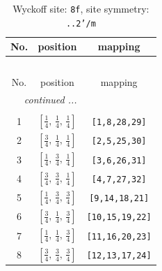 \documentclass[fleqn,8pt]{jsarticle}
\begin{document}
\begin{longtable}{ccc}
\caption{Wyckoff site: {\tt 8f}, site symmetry: {\tt ..2'/m}}
 \\
 \hline \hline
No. & position & mapping \\ \hline \endfirsthead

\multicolumn{2}{l}{\tablename\ \thetable{}} \\
 \hline \hline
No. & position & mapping \\ \hline \endhead

 \hline \hline
\multicolumn{2}{r}{\footnotesize\it continued ...} \\ \endfoot

 \hline \hline
\multicolumn{2}{r}{} \\ \endlastfoot

1 & $\left[ \frac{1}{4},\, \frac{1}{4},\, \frac{1}{4} \right]$ & {\tt [1,8,28,29]} \\ \hline
2 & $\left[ \frac{3}{4},\, \frac{1}{4},\, \frac{1}{4} \right]$ & {\tt [2,5,25,30]} \\ \hline
3 & $\left[ \frac{1}{4},\, \frac{3}{4},\, \frac{1}{4} \right]$ & {\tt [3,6,26,31]} \\ \hline
4 & $\left[ \frac{3}{4},\, \frac{3}{4},\, \frac{1}{4} \right]$ & {\tt [4,7,27,32]} \\ \hline
5 & $\left[ \frac{1}{4},\, \frac{3}{4},\, \frac{3}{4} \right]$ & {\tt [9,14,18,21]} \\ \hline
6 & $\left[ \frac{3}{4},\, \frac{1}{4},\, \frac{3}{4} \right]$ & {\tt [10,15,19,22]} \\ \hline
7 & $\left[ \frac{1}{4},\, \frac{1}{4},\, \frac{3}{4} \right]$ & {\tt [11,16,20,23]} \\ \hline
8 & $\left[ \frac{3}{4},\, \frac{3}{4},\, \frac{3}{4} \right]$ & {\tt [12,13,17,24]} \\
\end{longtable}
\renewcommand{\arraystretch}{1.2}
\end{document}
